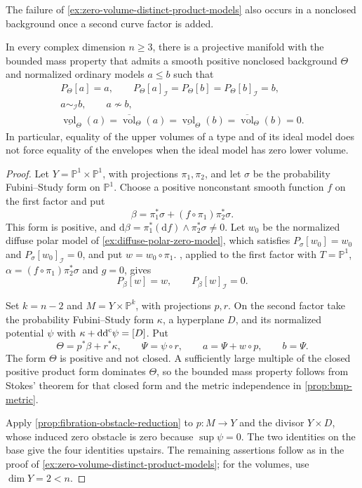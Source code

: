 The failure of \cref{ex:zero-volume-distinct-product-models} also occurs in a nonclosed background once a second curve factor is added.

\begin{example}\label{ex:nonclosed-zero-volume-distinct-models}
In every complex dimension $n\geq3$, there is a projective manifold with the bounded mass property that admits a smooth positive nonclosed background $\Theta$ and normalized ordinary models $a\leq b$ such that
\[
 \begin{gathered}
 P_\Theta[a]=a,\qquad
 P_\Theta[a]_{\mathcal I}=P_\Theta[b]=P_\Theta[b]_{\mathcal I}=b,\\
 a\sim_{\mathcal I}b,\qquad a\not\sim b,\\
 \underline{\operatorname{vol}}_\Theta(a)
 =\overline{\operatorname{vol}}_\Theta(a)
 =\underline{\operatorname{vol}}_\Theta(b)
 =\overline{\operatorname{vol}}_\Theta(b)=0.
 \end{gathered}
\]
In particular, equality of the upper volumes of a type and of its ideal model does not force equality of the envelopes when the ideal model has zero lower volume.
\end{example}
\begin{proof}
Let $Y=\mathbb P^1\times\mathbb P^1$, with projections $\pi_1,\pi_2$, and let $\sigma$ be the probability Fubini--Study form on $\mathbb P^1$. Choose a positive nonconstant smooth function $f$ on the first factor and put
\[
 \beta=\pi_1^*\sigma+(f\circ\pi_1)\pi_2^*\sigma.
\]
This form is positive, and $\mathrm d\beta=\pi_1^*(\mathrm df)\wedge\pi_2^*\sigma\ne0$. Let $w_0$ be the normalized diffuse polar model of \cref{ex:diffuse-polar-zero-model}, which satisfies $P_\sigma[w_0]=w_0$ and $P_\sigma[w_0]_{\mathcal I}=0$, and put $w=w_0\circ\pi_1$. , applied to the first factor with $T=\mathbb P^1$, $\alpha=(f\circ\pi_1)\pi_2^*\sigma$ and $g=0$, gives
\[
 P_\beta[w]=w,\qquad P_\beta[w]_{\mathcal I}=0.
\]

Set $k=n-2$ and $M=Y\times\mathbb P^k$, with projections $p,r$. On the second factor take the probability Fubini--Study form $\kappa$, a hyperplane $D$, and its normalized potential $\psi$ with $\kappa+\mathrm{dd}^{\mathrm{c}}\psi=[D]$. Put
\[
 \Theta=p^*\beta+r^*\kappa,\qquad
 \Psi=\psi\circ r,\qquad a=\Psi+w\circ p,\qquad b=\Psi.
\]
The form $\Theta$ is positive and not closed. A sufficiently large multiple of the closed positive product form dominates $\Theta$, so the bounded mass property follows from Stokes' theorem for that closed form and the metric independence in \cref{prop:bmp-metric}.

Apply \cref{prop:fibration-obstacle-reduction} to $p\colon M\to Y$ and the divisor $Y\times D$, whose induced zero obstacle is zero because $\sup\psi=0$. The two identities on the base give the four identities upstairs. The remaining assertions follow as in the proof of \cref{ex:zero-volume-distinct-product-models}; for the volumes, use $\dim Y=2<n$.
\end{proof}

